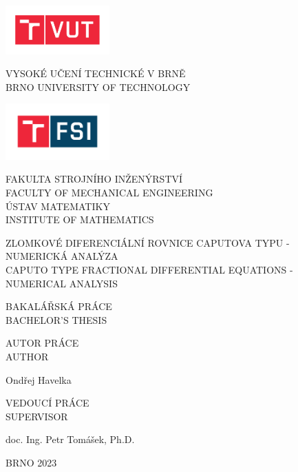 \documentclass[a4paper,12pt,twoside]{article}
\theoremstyle{definition}
\theoremstyle{remark}
\numberwithin{equation}{section}
\numberwithin{table}{section}
\numberwithin{figure}{section}
\newcommand{\tflarge}{\normalfont\sffamily\large\textmd}
\newcommand{\tfsmall}{\normalfont\sffamily\small\textmd}
\begin{document}
\thispagestyle{empty}
\noindent
\parbox[c]{4.2cm}{\includegraphics[width=4cm]{VUT.pdf}}
\parbox[c][1.5cm][t]{10cm}{\tflarge{VYSOKÉ UČENÍ TECHNICKÉ V BRNĚ}\\[0mm]\tfsmall{BRNO UNIVERSITY OF TECHNOLOGY}}

\vspace{1cm}\noindent
\parbox[c]{4.2cm}{\includegraphics[width=4cm]{FSI.pdf}}
\parbox[c][1.65cm][t]{10cm}{\tflarge{FAKULTA STROJNÍHO INŽENÝRSTVÍ}\\
\tfsmall{FACULTY OF MECHANICAL ENGINEERING}\\[3mm]
\tflarge{ÚSTAV MATEMATIKY}\\
\tfsmall{INSTITUTE OF MATHEMATICS}
}

\vspace{4cm}\noindent
{\normalfont\sffamily\Large\textmd{ZLOMKOVÉ DIFERENCIÁLNÍ ROVNICE CAPUTOVA TYPU -\\[2mm]
		NUMERICKÁ ANALÝZA}}
\\[5mm]
{\normalfont\sffamily\textmd{CAPUTO TYPE FRACTIONAL DIFFERENTIAL EQUATIONS - NUMERICAL ANALYSIS\\[0.5mm] }}
	
\vspace{5cm}\noindent
{\tflarge{BAKALÁŘSKÁ PRÁCE}}\\
{\tfsmall{BACHELOR'S THESIS}}

\vspace{1cm}\noindent
\parbox[t]{7.2cm}{\tflarge{AUTOR PRÁCE}\\ \tfsmall{AUTHOR}}\parbox[b]{5cm}{\tflarge{Ondřej Havelka}}

\vspace{1cm}\noindent
\parbox[t]{7.2cm}{\sf \large VEDOUCÍ PRÁCE\\ \small SUPERVISOR}\parbox[b]{8.3cm}{\sf \large doc. Ing. Petr Tomášek, Ph.D.}

\vspace{3.2cm}\noindent
{\sf BRNO 2023}
\end{document}
